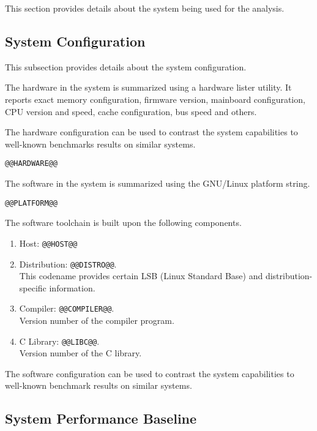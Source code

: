 \documentclass[a4paper]{article}
\begin{document}
This section provides details about the system being used for the analysis.

\subsection{System Configuration}

This subsection provides details about the system configuration.

The hardware in the system is summarized using a hardware lister utility.
It reports exact memory configuration, firmware version, mainboard configuration, CPU version and speed, cache configuration, bus speed and others.

\smallskip

The hardware configuration can be used to contrast the system capabilities to well-known benchmarks results on similar systems.

\begin{verbatim}
@@HARDWARE@@
\end{verbatim}

The software in the system is summarized using the GNU/Linux platform string.

\begin{verbatim}
@@PLATFORM@@
\end{verbatim}

The software toolchain is built upon the following components.

\begin{enumerate}
\item Host: {\tt @@HOST@@}
\item Distribution: {\tt @@DISTRO@@}. \\This codename provides certain LSB (Linux Standard Base) and distribution-specific information.
\item Compiler: {\tt @@COMPILER@@}. \\Version number of the compiler program.
\item C Library: {\tt @@LIBC@@}. \\Version number of the C library.
\end{enumerate}

\smallskip

The software configuration can be used to contrast the system capabilities to well-known benchmark results on similar systems.

\subsection{System Performance Baseline}
\end{document}
